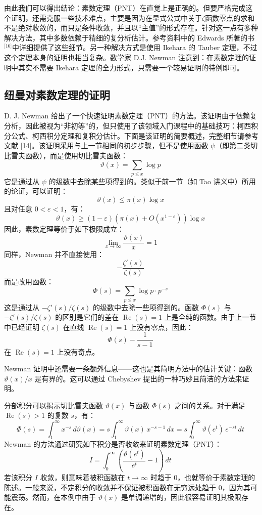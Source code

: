 由此我们可以得出结论：素数定理（PNT）在直觉上是正确的。但要严格完成这个证明，还需克服一些技术难点，主要是因为在显式公式中关于$\zeta$函数零点的求和不是绝对收敛的，而只是条件收敛，并且以“主值”的形式存在。针对这一点有多种解决方法，其中多数依赖于精细的复分析估计。参考资料中的 Edwards 所著的书\(^\text{[16]}\)中详细提供了这些细节。另一种解决方式是使用 Ikehara 的 Tauber 定理，不过这个定理本身的证明也相当复杂。数学家 D.J. Newman 注意到：在素数定理的证明中其实不需要 Ikehara 定理的全力形式，只需要一个较易证明的特例即可。
\subsection{纽曼对素数定理的证明}
D. J. Newman 给出了一个快速证明素数定理（PNT）的方法。该证明由于依赖复分析，因此被视为“非初等”的，但只使用了该领域入门课程中的基础技巧：柯西积分公式、柯西积分定理和复积分估计。下面是该证明的简要概述，完整细节请参考文献 [14]。该证明采用与上一节相同的初步步骤，但不是使用函数 $\psi$（即第二类切比雪夫函数），而是使用切比雪夫函数：
$$
\vartheta(x) = \sum_{p \leq x} \log p~
$$
它是通过从 $\psi$ 的级数中去除某些项得到的。类似于前一节（如 Tao 讲义中）所用的论证，可以证明：
$$
\vartheta(x) \leq \pi(x) \log x~
$$
且对任意 $0 < \varepsilon < 1$，有：
$$
\vartheta(x) \geq (1 - \varepsilon)\left(\pi(x) + O(x^{1 - \varepsilon})\right) \log x~
$$
因此，素数定理等价于如下极限成立：
$$
\lim_{x \to \infty} \frac{\vartheta(x)}{x} = 1~
$$
同样，Newman 并不直接使用：
$$
-\frac{\zeta'(s)}{\zeta(s)}~
$$
而是改用函数：
$$
\Phi(s) = \sum_{p \leq x} \log p \cdot p^{-s}~
$$
这是通过从 $-\zeta'(s)/\zeta(s)$ 的级数中去除一些项得到的。函数 $\Phi(s)$ 与 $-\zeta'(s)/\zeta(s)$ 的区别是它们的差在 $\operatorname{Re}(s) = 1$ 上是全纯的函数。由于上一节中已经证明 $\zeta(s)$ 在直线 $\operatorname{Re}(s) = 1$ 上没有零点，因此：
$$
\Phi(s) - \frac{1}{s - 1}~
$$
在 $\operatorname{Re}(s) = 1$ 上没有奇点。

Newman 证明中还需要一条额外信息——这也是其简明方法中的估计关键：函数 $\vartheta(x)/x$ 是有界的。这可以通过 Chebyshev 提出的一种巧妙且简洁的方法来证明。

分部积分可以揭示切比雪夫函数 $\vartheta(x)$ 与函数 $\Phi(s)$ 之间的关系。对于满足 $\operatorname{Re}(s) > 1$ 的复数 $s$，有：
$$
\Phi(s) = \int_{1}^{\infty} x^{-s} \, d\vartheta(x) = s \int_{1}^{\infty} \vartheta(x)\, x^{-s-1} \, dx = s \int_{0}^{\infty} \vartheta(e^{t})\, e^{-st} \, dt~
$$
Newman 的方法通过研究如下积分是否收敛来证明素数定理（PNT）：
$$
I = \int_{0}^{\infty} \left( \frac{\vartheta(e^{t})}{e^{t}} - 1 \right) \, dt~
$$
若该积分 $I$ 收敛，则意味着被积函数在 $t \to \infty$ 时趋于 0，也就等价于素数定理的陈述。一般来说，不定积分的收敛并不保证被积函数在无穷远处趋于 0，因为其可能震荡。然而，在本例中由于 $\vartheta(x)$ 是单调递增的，因此很容易证明其极限存在。

